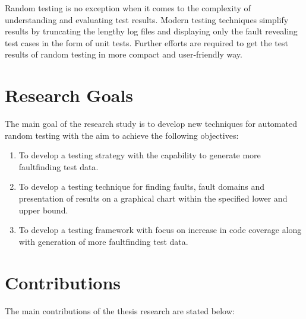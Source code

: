 Random testing is no exception when it comes to the complexity of understanding and evaluating test results. Modern testing techniques simplify results by truncating the lengthy log files and displaying only the fault revealing test cases in the form of unit tests. Further efforts are required to get the test results of random testing in more compact and user-friendly way. 


\section{Research Goals} \label{ResearchGoals}
The main goal of the research study is to develop new techniques for automated random testing with the aim to achieve the following objectives:

\begin{enumerate}
\item To develop a testing strategy with the capability to generate more faultfinding test data.

\item To develop a testing technique for finding faults, fault domains and presentation of results on a graphical chart within the specified lower and upper bound. 

\item To develop a testing framework with focus on increase in code coverage along with generation of more faultfinding test data. 

\end{enumerate}

\section{Contributions}
The main contributions of the thesis research are stated below: 

